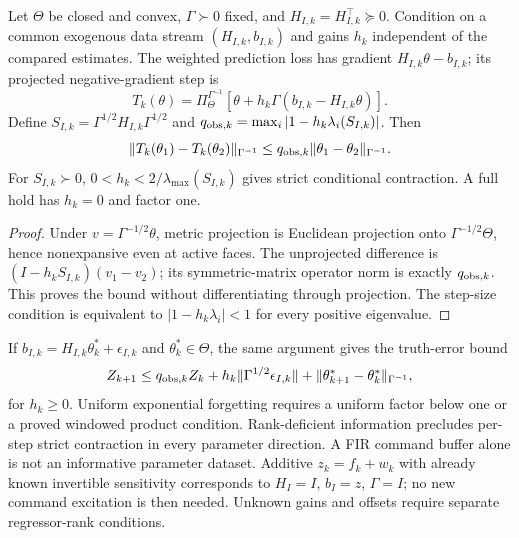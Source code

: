\begin{proposition}
\label{prop:sampled-gradient}
Let $\Theta$ be closed and convex, $\Gamma\succ0$ fixed, and
$H_{I,k}=H_{I,k}^\top\succeq0$. Condition on a common exogenous data stream
$(H_{I,k},b_{I,k})$ and gains $h_k$ independent of the compared estimates.
The weighted prediction loss has gradient $H_{I,k}\theta-b_{I,k}$; its
projected negative-gradient step is
\begin{equation}
T_k(\theta)=\Pi_\Theta^{\Gamma^{-1}}
 \left[\theta+h_k\Gamma(b_{I,k}-H_{I,k}\theta)\right].
\label{eq:sampled-gradient}
\end{equation}
Define $S_{I,k}=\Gamma^{1/2}H_{I,k}\Gamma^{1/2}$ and
$q_{{\rm obs},k}=\max_i|1-h_k\lambda_i(S_{I,k})|$. Then
\begin{equation}
\|T_k(\theta_1)-T_k(\theta_2)\|_{\Gamma^{-1}}
\le q_{{\rm obs},k}\|\theta_1-\theta_2\|_{\Gamma^{-1}}.
\label{eq:sampled-gradient-contraction}
\end{equation}
For $S_{I,k}\succ0$, $0<h_k<2/\lambda_{\max}(S_{I,k})$ gives strict
conditional contraction. A full hold has $h_k=0$ and factor one.
\end{proposition}
\begin{proof}
Under $v=\Gamma^{-1/2}\theta$, metric projection is Euclidean projection
onto $\Gamma^{-1/2}\Theta$, hence nonexpansive even at active faces. The
unprojected difference is $(I-h_k S_{I,k})(v_1-v_2)$; its symmetric-matrix
operator norm is exactly $q_{{\rm obs},k}$. This proves the bound without
differentiating through projection. The step-size condition is equivalent
to $|1-h_k\lambda_i|<1$ for every positive eigenvalue.
\end{proof}
If $b_{I,k}=H_{I,k}\theta_k^*+\epsilon_{I,k}$ and
$\theta_k^*\in\Theta$, the same argument gives the truth-error bound
\begin{equation}
Z_{k+1}\le q_{{\rm obs},k}Z_k+
 h_k\|\Gamma^{1/2}\epsilon_{I,k}\|
 +\|\theta_{k+1}^*-\theta_k^*\|_{\Gamma^{-1}},
\label{eq:sampled-gradient-error}
\end{equation}
for $h_k\ge0$. Uniform exponential forgetting requires a uniform factor
below one or a proved windowed product condition. Rank-deficient information
precludes per-step strict contraction in every parameter direction. A FIR
command buffer alone is not an informative parameter dataset. Additive
$z_k=f_k+w_k$ with already known invertible sensitivity corresponds to
$H_I=I$, $b_I=z$, $\Gamma=I$; no new command excitation is then needed.
Unknown gains and offsets require separate regressor-rank conditions.

